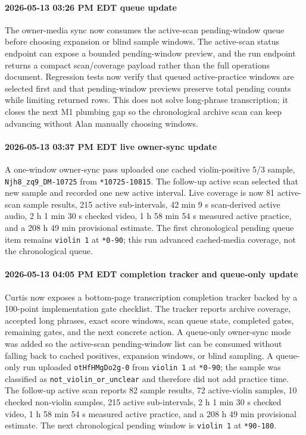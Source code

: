 \paragraph{2026-05-13 03:26 PM EDT queue update} The owner-media sync now consumes the active-scan pending-window queue before choosing expansion or blind sample windows. The active-scan status endpoint can expose a bounded pending-window preview, and the run endpoint returns a compact scan/coverage payload rather than the full operations document. Regression tests now verify that queued active-practice windows are selected first and that pending-window previews preserve total pending counts while limiting returned rows. This does not solve long-phrase transcription; it closes the next M1 plumbing gap so the chronological archive scan can keep advancing without Alan manually choosing windows.
\paragraph{2026-05-13 03:37 PM EDT live owner-sync update} A one-window owner-sync pass uploaded one cached violin-positive 5/3 sample, \texttt{Njh8\_zq9\_DM-10725} from \texttt{*10725-10815}. The follow-up active scan selected that new sample and recorded one new active interval. Live coverage is now 81 active-scan sample results, 215 active sub-intervals, 42 min 9 s scan-derived active audio, 2 h 1 min 30 s checked video, 1 h 58 min 54 s measured active practice, and a 208 h 49 min provisional estimate. The first chronological pending queue item remains \texttt{violin 1} at \texttt{*0-90}; this run advanced cached-media coverage, not the chronological queue.
\paragraph{2026-05-13 04:05 PM EDT completion tracker and queue-only update} Curtis now exposes a bottom-page transcription completion tracker backed by a 100-point implementation gate checklist. The tracker reports archive coverage, accepted long phrases, exact score windows, scan queue state, completed gates, remaining gates, and the next concrete action. A queue-only owner-sync mode was added so the active-scan pending-window list can be consumed without falling back to cached positives, expansion windows, or blind sampling. A queue-only run uploaded \texttt{otHfHMgDo2g-0} from \texttt{violin 1} at \texttt{*0-90}; the sample was classified as \texttt{not\_violin\_or\_unclear} and therefore did not add practice time. The follow-up active scan reports 82 sample results, 72 active-violin samples, 10 checked non-violin samples, 215 active sub-intervals, 2 h 1 min 30 s checked video, 1 h 58 min 54 s measured active practice, and a 208 h 49 min provisional estimate. The next chronological pending window is \texttt{violin 1} at \texttt{*90-180}.
